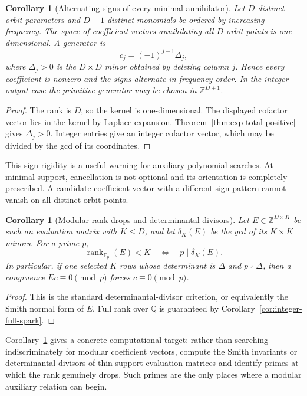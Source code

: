 \documentclass[11pt,oneside]{article}
\newtheorem{corollary}[theorem]{Corollary}
\theoremstyle{definition}
\theoremstyle{remark}
\newcommand{\Z}{\mathbb Z}
\newcommand{\Q}{\mathbb Q}
\newcommand{\rank}{\operatorname{rank}}
\begin{document}
\begin{corollary}[Alternating signs of every minimal annihilator]
\label{cor:alternating-minimal}
Let $D$ distinct orbit parameters and $D+1$ distinct monomials be ordered by increasing
frequency.  The space of coefficient vectors annihilating all $D$ orbit points is
one-dimensional.  A generator is
\[
  c_j=(-1)^{j-1}\Delta_j,
\]
where $\Delta_j>0$ is the $D\times D$ minor obtained by deleting column $j$.  Hence every
coefficient is nonzero and the signs alternate in frequency order.  In the integer-output
case the primitive generator may be chosen in $\Z^{D+1}$.
\end{corollary}

\begin{proof}
The rank is $D$, so the kernel is one-dimensional.  The displayed cofactor vector lies in the
kernel by Laplace expansion.  Theorem~\ref{thm:exp-total-positive} gives $\Delta_j>0$.
Integer entries give an integer cofactor vector, which may be divided by the gcd of its
coordinates.
\end{proof}

This sign rigidity is a useful warning for auxiliary-polynomial searches.  At minimal
support, cancellation is not optional and its orientation is completely prescribed.  A
candidate coefficient vector with a different sign pattern cannot vanish on all distinct
orbit points.

\begin{corollary}[Modular rank drops and determinantal divisors]
\label{cor:modular-rank-drop}
Let $E\in\Z^{D\times K}$ be such an evaluation matrix with $K\le D$, and let
$\delta_K(E)$ be the gcd of its $K\times K$ minors.  For a prime $p$,
\[
  \rank_{\mathbb F_p}(E)<K
  \quad\Longleftrightarrow\quad
  p\mid\delta_K(E).
\]
In particular, if one selected $K$ rows whose determinant is $\Delta$ and $p\nmid\Delta$,
then a congruence $Ec\equiv0\pmod p$ forces $c\equiv0\pmod p$.
\end{corollary}

\begin{proof}
This is the standard determinantal-divisor criterion, or equivalently the Smith normal form
of $E$.  Full rank over $\Q$ is guaranteed by Corollary~\ref{cor:integer-full-spark}.
\end{proof}

Corollary~\ref{cor:modular-rank-drop} gives a concrete computational target: rather than
searching indiscriminately for modular coefficient vectors, compute the Smith invariants or
determinantal divisors of thin-support evaluation matrices and identify primes at which the
rank genuinely drops.  Such primes are the only places where a modular auxiliary relation can
begin.
\end{document}
